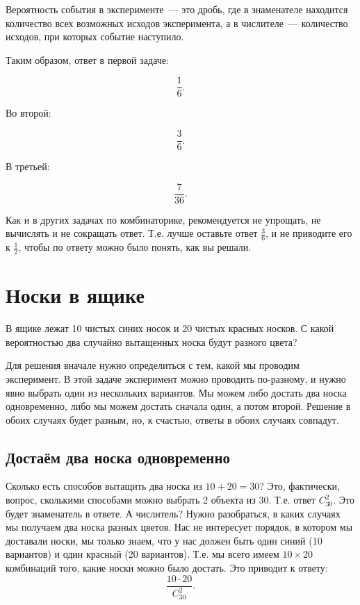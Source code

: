 \documentclass{article}
\renewcommand{\c}[2]{$C_{#1}^{#2}$}
\newcommand{\cc}[2]{C_{#1}^{#2}}
\newenvironment{exercise}{%
\begin{framed}\par\noindent\slshape%
}%
{\end{framed}}
\begin{document}
Вероятность события в эксперименте~--- это дробь, где в знаменателе находится количество всех возможных исходов эксперимента, а в числителе~--- количество исходов, при которых событие наступило.

Таким образом, ответ в первой задаче:

$$\dfrac16.$$

Во второй:

$$\dfrac36.$$

В третьей:

$$\dfrac7{36}.$$

Как и в других задачах по комбинаторике, рекомендуется не упрощать, не вычислять и не сокращать ответ. Т.е. лучше оставьте ответ $\frac36$, и не приводите его к $\frac12$, чтобы по ответу можно было понять, как вы решали.

\section{Носки в ящике}

\begin{exercise}
	В ящике лежат 10 чистых синих носок и 20 чистых красных носков. С какой вероятностью два случайно вытащенных носка будут разного цвета?
\end{exercise}

Для решения вначале нужно определиться с тем, какой мы проводим эксперимент. В этой задаче эксперимент можно проводить по-разному, и нужно явно выбрать один из нескольких вариантов. Мы можем либо достать два носка одновременно, либо мы можем достать сначала один, а потом второй. Решение в обоих случаях будет разным, но, к счастью, ответы в обоих случаях совпадут.

\subsection{Достаём два носка одновременно}

Сколько есть способов вытащить два носка из $10 + 20 = 30$? Это, фактически, вопрос, сколькими способами можно выбрать 2 объекта из 30. Т.е. ответ \c{30}2. Это будет знаменатель в ответе.
А числитель? Нужно разобраться, в каких случаях мы получаем два носка разных цветов. Нас не интересует порядок, в котором мы доставали носки, мы только знаем, что у нас должен быть один синий (10 вариантов) и один красный (20 вариантов). Т.е. мы всего имеем $10\times20$ комбинаций того, какие носки можно было достать. Это приводит к ответу:
$$\dfrac{10\cdot20}{\cc{30}2}.$$
\end{document}
